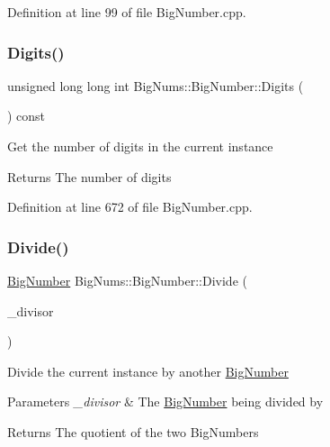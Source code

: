Definition at line 99 of file Big\+Number.\+cpp.

\mbox{\label{class_big_nums_1_1_big_number_ae35841de4a2037e6edc02bcbf40600ba}} 
\subsubsection{\texorpdfstring{Digits()}{Digits()}}
{\footnotesize\ttfamily unsigned long long int Big\+Nums\+::\+Big\+Number\+::\+Digits (\begin{DoxyParamCaption}{ }\end{DoxyParamCaption}) const}

Get the number of digits in the current instance \begin{DoxyReturn}{Returns}
The number of digits 
\end{DoxyReturn}


Definition at line 672 of file Big\+Number.\+cpp.

\mbox{\label{class_big_nums_1_1_big_number_a55f83d787d248c55d9df8347c2fcb7ed}} 
\subsubsection{\texorpdfstring{Divide()}{Divide()}}
{\footnotesize\ttfamily \mbox{\hyperlink{class_big_nums_1_1_big_number}{Big\+Number}} Big\+Nums\+::\+Big\+Number\+::\+Divide (\begin{DoxyParamCaption}\item[{const \mbox{\hyperlink{class_big_nums_1_1_big_number}{Big\+Number}} \&}]{\+\_\+divisor }\end{DoxyParamCaption})}

Divide the current instance by another \mbox{\hyperlink{class_big_nums_1_1_big_number}{Big\+Number}} 
\begin{DoxyParams}{Parameters}
{\em \+\_\+divisor} & The \mbox{\hyperlink{class_big_nums_1_1_big_number}{Big\+Number}} being divided by \\
\hline
\end{DoxyParams}
\begin{DoxyReturn}{Returns}
The quotient of the two Big\+Numbers 
\end{DoxyReturn}


